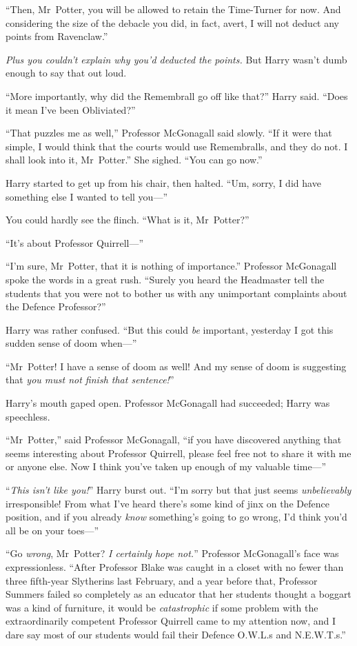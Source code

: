“Then, Mr~Potter, you will be allowed to retain the Time-Turner for now. And considering the size of the debacle you did, in fact, avert, I will not deduct any points from Ravenclaw.”

\emph{Plus you couldn’t explain why you’d deducted the points.} But Harry wasn’t dumb enough to say that out loud.

“More importantly, why did the Remembrall go off like that?” Harry said. “Does it mean I’ve been Obliviated?”

“That puzzles me as well,” Professor McGonagall said slowly. “If it were that simple, I would think that the courts would use Remembralls, and they do not. I shall look into it, Mr~Potter.” She sighed. “You can go now.”

Harry started to get up from his chair, then halted. “Um, sorry, I did have something else I wanted to tell you—”

You could hardly see the flinch. “What is it, Mr~Potter?”

“It’s about Professor Quirrell—”

“I’m sure, Mr~Potter, that it is nothing of importance.” Professor McGonagall spoke the words in a great rush. “Surely you heard the Headmaster tell the students that you were not to bother us with any unimportant complaints about the Defence Professor?”

Harry was rather confused. “But this could \emph{be} important, yesterday I got this sudden sense of doom when—”

“Mr~Potter! I have a sense of doom as well! And my sense of doom is suggesting that \emph{you must not finish that sentence!}”

Harry’s mouth gaped open. Professor McGonagall had succeeded; Harry was speechless.

“Mr~Potter,” said Professor McGonagall, “if you have discovered anything that seems interesting about Professor Quirrell, please feel free not to share it with me or anyone else. Now I think you’ve taken up enough of my valuable time—”

“\emph{This isn’t like you!}” Harry burst out. “I’m sorry but that just seems \emph{unbelievably} irresponsible! From what I’ve heard there’s some kind of jinx on the Defence position, and if you already \emph{know} something’s going to go wrong, I’d think you’d all be on your toes—”

“Go \emph{wrong}, Mr~Potter? \emph{I certainly hope not.}” Professor McGonagall’s face was expressionless. “After Professor Blake was caught in a closet with no fewer than three fifth-year Slytherins last February, and a year before that, Professor Summers failed so completely as an educator that her students thought a boggart was a kind of furniture, it would be \emph{catastrophic} if some problem with the extraordinarily competent Professor Quirrell came to my attention now, and I dare say most of our students would fail their Defence O.W.L.s and N.E.W.T.s.”

